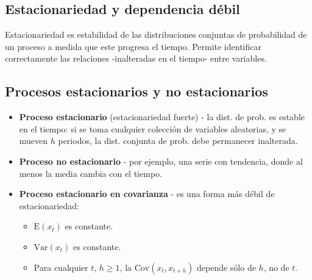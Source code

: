 \documentclass[10pt, a4paper, landscape]{extarticle}
\newcommand{\E}{\mathrm{E}}
\newcommand{\Var}{\mathrm{Var}}
\newcommand{\Cov}{\mathrm{Cov}}
\begin{document}
\begin{multicols}{3}
\section*{Estacionariedad y dependencia débil}
	Estacionariedad es estabilidad de las distribuciones conjuntas de probabilidad de un proceso a medida que este progresa el tiempo. Permite identificar correctamente las relaciones -inalteradas en el tiempo- entre variables.
	\subsection*{Procesos estacionarios y no estacionarios}
		\begin{itemize}[leftmargin=*]
			\item \textbf{Proceso estacionario} (estacionariedad fuerte) - la dist. de prob. es estable en el tiempo: si se toma cualquier colección de variables aleatorias, y se mueven $h$ periodos, la dist. conjunta de prob. debe permanecer inalterada.
\columnbreak
			\item \textbf{Proceso no estacionario} - por ejemplo, una serie con tendencia, donde al menos la media cambia con el tiempo.
			\item \textbf{Proceso estacionario en covarianza} - es una forma más débil de estacionariedad:
			\begin{itemize}[leftmargin=*]
				\item $\E(x_t)$ es constante.
				\item $\Var(x_t)$ es constante.
				\item Para cualquier $t$,  $h \geq 1$, la $\Cov(x_t, x_{t+h})$ depende sólo de $h$, no de $t$.
			\end{itemize}
		\end{itemize}

\end{multicols}
\end{document}
